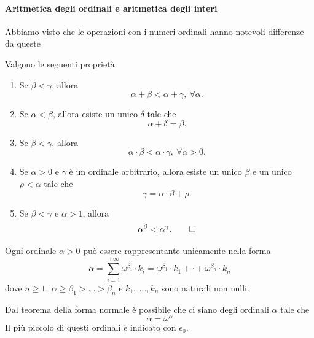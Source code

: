 \paragraph{Aritmetica degli ordinali e aritmetica degli interi}
Abbiamo visto che le operazioni con i numeri ordinali hanno notevoli differenze da queste 
\begin{property}
	Valgono le seguenti proprietà:
	\begin{enumerate}
		\item Se $\beta<\gamma$, allora
		\begin{equation*}
			\alpha+\beta<\alpha+\gamma,\ \forall \alpha.
		\end{equation*}
		\item Se $\alpha<\beta$, allora esiste un unico $\delta$ tale che \begin{equation*}
			\alpha+\delta=\beta.
		\end{equation*}
		\item Se $\beta<\gamma$, allora
		\begin{equation*}
			\alpha\cdot \beta<\alpha\cdot\gamma,\ \forall \alpha>0.
		\end{equation*}
		\item Se $\alpha>0$ e $\gamma$ è un ordinale arbitrario, allora esiste un unico $\beta$ e un unico $\rho<\alpha$ tale che
		\begin{equation*}
			\gamma=\alpha\cdot\beta+\rho.
		\end{equation*}
		\item Se $\beta<\gamma$ e $\alpha>1$, allora
		\begin{equation*}
			\alpha^{\beta}<\alpha^{\gamma}.\qedhere
		\end{equation*}
	\end{enumerate}
\end{property}
\begin{theoremaqed}
	Ogni ordinale $\alpha>0$ può essere rappresentante unicamente nella forma
	\begin{equation}
		\alpha=\sum_{i=1}^{+\infty}\omega^{\beta_i}\cdot k_i=\omega^{\beta_1}\cdot k_1+\cdot+\omega^{\beta_n}\cdot k_n
	\end{equation}
dove $n\geq 1,\ \alpha\geq \beta_1>\ldots>\beta_n$ e $k_1,\ \ldots, k_n$ sono naturali non nulli.
\end{theoremaqed}
Dal teorema della forma normale è possibile che ci siano degli ordinali $\alpha$ tale che
\begin{equation*}
	\alpha=\omega^{\alpha}
\end{equation*}
Il più piccolo di questi ordinali è indicato con $\epsilon_0$.
